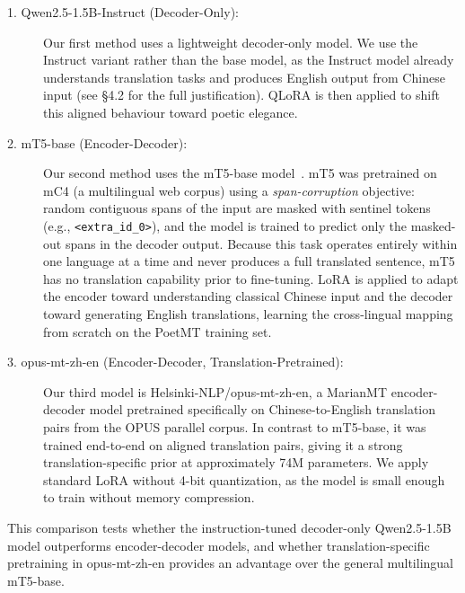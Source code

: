     \begin{description}
        \item[1. Qwen2.5-1.5B-Instruct (Decoder-Only):] Our first method uses a lightweight decoder-only model. We use the Instruct variant rather than the base model, as the Instruct model already understands translation tasks and produces English output from Chinese input (see \S4.2 for the full justification). QLoRA is then applied to shift this aligned behaviour toward poetic elegance.

        \item [2. mT5-base (Encoder-Decoder):] Our second method uses the mT5-base model~\cite{xue2021mt5}. mT5 was pretrained on mC4 (a multilingual web corpus) using a \emph{span-corruption} objective: random contiguous spans of the input are masked with sentinel tokens (e.g., \texttt{<extra\_id\_0>}), and the model is trained to predict only the masked-out spans in the decoder output. Because this task operates entirely within one language at a time and never produces a full translated sentence, mT5 has no translation capability prior to fine-tuning. LoRA is applied to adapt the encoder toward understanding classical Chinese input and the decoder toward generating English translations, learning the cross-lingual mapping from scratch on the PoetMT training set.

        \item [3. opus-mt-zh-en (Encoder-Decoder, Translation-Pretrained):] Our third model is Helsinki-NLP/opus-mt-zh-en, a MarianMT encoder-decoder model pretrained specifically on Chinese-to-English translation pairs from the OPUS parallel corpus. In contrast to mT5-base, it was trained end-to-end on aligned translation pairs, giving it a strong translation-specific prior at approximately 74M parameters. We apply standard LoRA without 4-bit quantization, as the model is small enough to train without memory compression.
    \end{description}

    This comparison tests whether the instruction-tuned decoder-only Qwen2.5-1.5B model outperforms encoder-decoder models, and whether translation-specific pretraining in opus-mt-zh-en provides an advantage over the general multilingual mT5-base.



